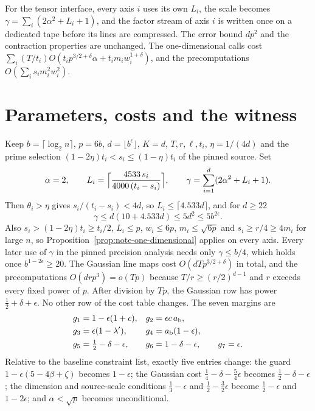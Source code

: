 \documentclass[11pt]{article}
\newcommand{\ab}{a_{\rm b}}
\begin{document}
For the tensor interface, every axis $i$ uses its own $L_i$, the scale
becomes $\gamma=\sum_i(2\alpha^2+L_i+1)$, and the factor stream of axis $i$
is written once on a dedicated tape before its lines are compressed. The
error bound $dp^2$ and the contraction properties are unchanged. The
one-dimensional calls cost $\sum_i(T/t_i)O(t_ip^{3/2+\delta}\alpha
+t_im_iw_i^{1+\delta})$, and the precomputations
$O(\sum_is_im_i^2w_i^2)$.

\section{Parameters, costs and the witness}
Keep $b=\lceil\log_2n\rceil$, $p=6b$, $d=\lfloor b^\epsilon\rfloor$, $K=d$,
$T,r,\ell,t_i$, $\eta=1/(4d)$ and the prime selection
$(1-2\eta)t_i<s_i\le(1-\eta)t_i$ of the pinned source. Set
\[
 \alpha=2,\qquad
 L_i=\Bigl\lceil\frac{4533\,s_i}{4000\,(t_i-s_i)}\Bigr\rceil,\qquad
 \gamma=\sum_{i=1}^d(2\alpha^2+L_i+1).
\]
Then $\theta_i>\eta$ gives $s_i/(t_i-s_i)<4d$, so $L_i\le\lceil4.533d\rceil$,
and for $d\ge22$
\[
 \gamma\le d(10+4.533d)\le5d^2\le5b^{2\epsilon}.
\]
Also $s_i>(1-2\eta)t_i\ge t_i/2$, $L_i\le p$, $w_i\le6p$,
$m_i\le\sqrt{6p}$ and $s_i\ge r/4\ge4m_i$ for large $n$, so
Proposition~\ref{prop:note-one-dimensional} applies on every axis. Every
later use of $\gamma$ in the pinned precision analysis needs only
$\gamma\le b/4$, which holds once $b^{1-2\epsilon}\ge20$. The Gaussian line
maps cost $O(dTp^{3/2+\delta})$ in total, and the precomputations
$O(drp^3)=o(Tp)$ because $T/r\ge(r/2)^{d-1}$ and $r$ exceeds every fixed
power of $p$. After division by $Tp$, the Gaussian row has power
$\frac12+\delta+\epsilon$. No other row of the cost table changes. The seven
margins are
\begin{align*}
 g_1&=1-\epsilon(1+c), &g_2&=\epsilon c\,\ab,\\
 g_3&=\epsilon(1-\lambda'), &g_4&=\ab(1-\epsilon),\\
 g_5&=\tfrac12-\delta-\epsilon,
 &g_6&=1-\delta-\epsilon,\qquad g_7=\epsilon.
\end{align*}
Relative to the baseline constraint list, exactly five entries change:
the guard $1-\epsilon(5-4\beta+\zeta)$ becomes $1-\epsilon$; the Gaussian
cost $\frac14-\delta-\frac54\epsilon$ becomes $\frac12-\delta-\epsilon$; the
dimension and source-scale conditions $\frac13-\epsilon$ and
$\frac12-\frac32\epsilon$ become $\frac12-\epsilon$ and $1-2\epsilon$; and
$\alpha<\sqrt p$ becomes unconditional.
\end{document}
